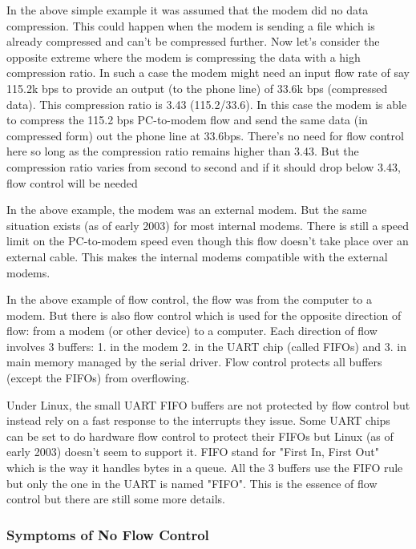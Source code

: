 \documentclass[11pt, twosides, titlepage]{article}
\begin{document}
            In the above simple example it was assumed that the modem did no data compression. This could happen when the modem is sending a file which is already compressed and can't be compressed further. Now let's consider the opposite extreme where the modem is compressing the data with a high compression ratio. In such a case the modem might need an input flow rate of say 115.2k bps to provide an output (to the phone line) of 33.6k bps (compressed data). This compression ratio is 3.43 (115.2/33.6). In this case the modem is able to compress the 115.2 bps PC-to-modem flow and send the same data (in compressed form) out the phone line at 33.6bps. There's no need for flow control here so long as the compression ratio remains higher than 3.43. But the compression ratio varies from second to second and if it should drop below 3.43, flow control will be needed
            
            In the above example, the modem was an external modem. But the same situation exists (as of early 2003) for most internal modems. There is still a speed limit on the PC-to-modem speed even though this flow doesn't take place over an external cable. This makes the internal modems compatible with the external modems.
            
            In the above example of flow control, the flow was from the computer to a modem. But there is also flow control which is used for the opposite direction of flow: from a modem (or other device) to a computer. Each direction of flow involves 3 buffers: 1. in the modem 2. in the UART chip (called FIFOs) and 3. in main memory managed by the serial driver. Flow control protects all buffers (except the FIFOs) from overflowing.
            
            Under Linux, the small UART FIFO buffers are not protected by flow control but instead rely on a fast response to the interrupts they issue. Some UART chips can be set to do hardware flow control to protect their FIFOs but Linux (as of early 2003) doesn't seem to support it. FIFO stand for "First In, First Out" which is the way it handles bytes in a queue. All the 3 buffers use the FIFO rule but only the one in the UART is named "FIFO". This is the essence of flow control but there are still some more details.

        \subsubsection{Symptoms of No Flow Control}
\end{document}
